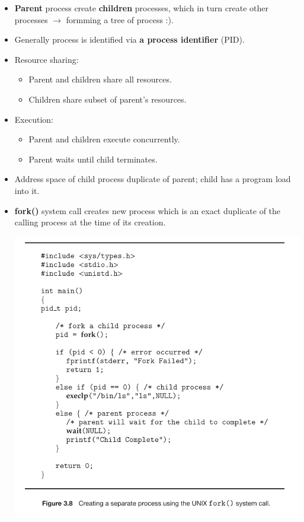 \documentclass[10pt]{article}
\newcommand{\tf}{\textbf}
\newcommand{\rarrow}{\rightarrow}
\begin{document}
\begin{itemize}
	\item \tf{Parent} process create \tf{children} processes, which in turn create other processes $\rarrow$ formming a tree of process :).
	\item Generally process is identified via \tf{a process identifier} (PID).
	\item Resource sharing:
	\begin{itemize}
		\item Parent and children share all resources.
		\item Children share subset of parent's resources.	
	\end{itemize}

	\item Execution:
	\begin{itemize}
		\item Parent and children execute concurrently.
		\item Parent waits until child terminates.
	\end{itemize}

	\item Address space of child process duplicate of parent; child has a program load into it.
	\item \tf{fork()} system call creates new process which is an exact duplicate of the calling process at the time of its creation.
	
	\bigbreak
	\includegraphics[scale = 0.7]{fork.png}
	\bigbreak


\end{itemize}
\end{document}
